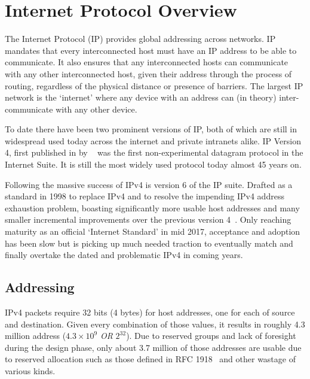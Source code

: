 
\section[IP Overview]{Internet Protocol Overview}\label{sec:intro-ip}
The Internet Protocol (IP) provides global addressing across networks. IP mandates that every interconnected host must have an IP address to be able to communicate. It also ensures that any interconnected hosts can communicate with any other interconnected host, given their address through the process of routing, regardless of the physical distance or presence of barriers. The largest IP network is the `internet' where any device with an address can (in theory) inter-communicate with any other device.

To date there have been two prominent versions of IP, both of which are still in widespread used today across the internet and private intranets alike. IP Version 4, first published in \citeyear{cerf1974protocol} by \citeauthor{cerf1974protocol}~\cite{cerf1974protocol} was the first non-experimental datagram protocol in the Internet Suite. It is still the most widely used protocol today almost 45 years on.

Following the massive success of IPv4 is version 6 of the IP suite. Drafted as a standard in 1998 to replace IPv4 and to resolve the impending IPv4 address exhaustion problem, boasting significantly more usable host addresses and many smaller incremental improvements over the previous version 4~\cite{hovav2004model}. Only reaching maturity as an official `Internet Standard' in mid 2017, acceptance and adoption has been slow but is picking up much needed traction to eventually match and finally overtake the dated and problematic IPv4 in coming years.

    \subsection{Addressing}
    IPv4 packets require 32 bits (4 bytes) for host addresses, one for each of source and destination. Given every combination of those values, it results in roughly 4.3 million address ($4.3 \times 10^{9}$ \textit{OR} $2^{32}$). Due to reserved groups and lack of foresight during the design phase, only about 3.7 million of those addresses are usable due to reserved allocation such as those defined in RFC 1918~\cite{rfc1918} and other wastage of various kinds.

